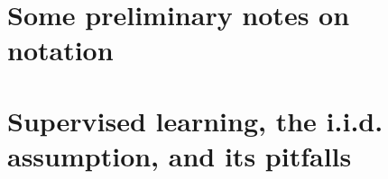 
\cite{zhu2014capturing}

\section{Some preliminary notes on notation}\label{sec:notation}

\section{Supervised learning, the i.i.d. assumption, and its pitfalls}\label{sec:iid}

